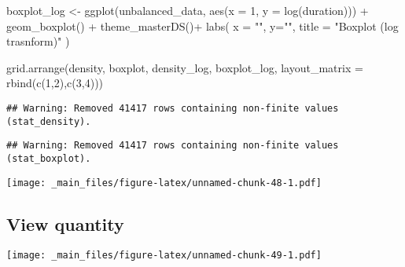 \documentclass[
]{book}
\newenvironment{Shaded}{\begin{snugshade}}{\end{snugshade}}
\newcommand{\AttributeTok}[1]{\textcolor[rgb]{0.77,0.63,0.00}{#1}}
\newcommand{\DecValTok}[1]{\textcolor[rgb]{0.00,0.00,0.81}{#1}}
\newcommand{\FunctionTok}[1]{\textcolor[rgb]{0.00,0.00,0.00}{#1}}
\newcommand{\NormalTok}[1]{#1}
\newcommand{\OtherTok}[1]{\textcolor[rgb]{0.56,0.35,0.01}{#1}}
\newcommand{\SpecialCharTok}[1]{\textcolor[rgb]{0.00,0.00,0.00}{#1}}
\newcommand{\StringTok}[1]{\textcolor[rgb]{0.31,0.60,0.02}{#1}}
\begin{document}
\begin{Shaded}
\begin{Highlighting}[]
\NormalTok{  boxplot\_log }\OtherTok{\textless{}{-}} \FunctionTok{ggplot}\NormalTok{(unbalanced\_data, }\FunctionTok{aes}\NormalTok{(}\AttributeTok{x =} \DecValTok{1}\NormalTok{, }\AttributeTok{y =} \FunctionTok{log}\NormalTok{(duration))) }\SpecialCharTok{+} 
    \FunctionTok{geom\_boxplot}\NormalTok{() }\SpecialCharTok{+} 
    \FunctionTok{theme\_masterDS}\NormalTok{()}\SpecialCharTok{+}
    \FunctionTok{labs}\NormalTok{(}
      \AttributeTok{x =} \StringTok{""}\NormalTok{,}
      \AttributeTok{y=}\StringTok{""}\NormalTok{,}
      \AttributeTok{title =} \StringTok{"Boxplot (log trasnform)"}
\NormalTok{    ) }

\FunctionTok{grid.arrange}\NormalTok{(density, boxplot, density\_log, boxplot\_log,  }\AttributeTok{layout\_matrix =} \FunctionTok{rbind}\NormalTok{(}\FunctionTok{c}\NormalTok{(}\DecValTok{1}\NormalTok{,}\DecValTok{2}\NormalTok{),}\FunctionTok{c}\NormalTok{(}\DecValTok{3}\NormalTok{,}\DecValTok{4}\NormalTok{)))}
\end{Highlighting}
\end{Shaded}

\begin{verbatim}
## Warning: Removed 41417 rows containing non-finite values (stat_density).
\end{verbatim}

\begin{verbatim}
## Warning: Removed 41417 rows containing non-finite values (stat_boxplot).
\end{verbatim}

\texttt{[image: \_main\_files/figure-latex/unnamed-chunk-48-1.pdf]}

\hypertarget{view-quantity}{%
\subsection{View quantity}\label{view-quantity}}

\begin{Shaded}
\end{Shaded}

\texttt{[image: \_main\_files/figure-latex/unnamed-chunk-49-1.pdf]}

\begin{Shaded}
\end{Shaded}
\end{document}
